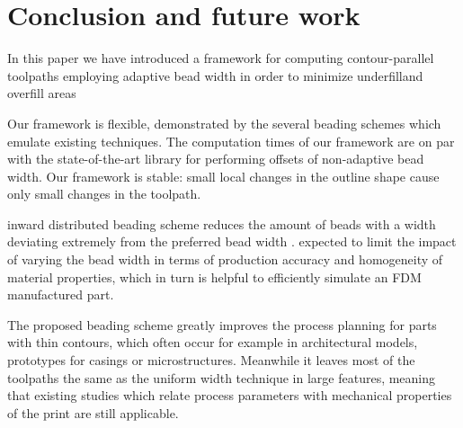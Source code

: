 \section{Conclusion and future work}
In this paper we have introduced a framework for computing contour-parallel toolpaths employing adaptive bead width in order to minimize underfilland overfill areas

Our framework is flexible, demonstrated by the several beading schemes which emulate existing techniques.
The computation times of our framework are on par with the state-of-the-art library for performing offsets of non-adaptive bead width.
Our framework is stable: small local changes in the outline shape cause only small changes in the toolpath.

 inward distributed beading scheme
 reduces the amount of beads with a width deviating extremely from the preferred bead width .
 expected to limit the impact of varying the bead width in terms of production accuracy and homogeneity of material properties,
which in turn is helpful to efficiently simulate an FDM manufactured part.

The proposed beading scheme greatly improves the process planning for parts with thin contours, which often occur for example in architectural models, prototypes for casings or microstructures.
Meanwhile it leaves most of the toolpaths the same as the uniform width technique in large features, meaning that existing studies which relate process parameters with mechanical properties of the print are still applicable.

